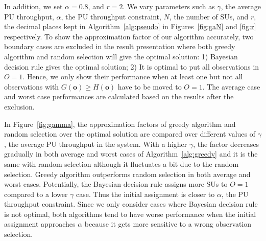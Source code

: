 \documentclass[conference]{IEEEtran}
\begin{document}
In addition, we set $\alpha=0.8$,  and $r=2$. We vary parameters such as $\gamma$, the average PU throughput, $\alpha$, the PU throughput constraint, $N$, the number of SUs, and $r$, the decimal places kept in Algorithm~\ref{alg:pseudo} in Figures~\ref{fig:gaN} and \ref{fig:r} respectively. To show the approximation factor of our algorithm accurately, two boundary cases are excluded in the result presentation where both greedy algorithm and random selection will give the optimal solution: 1) Bayesian decision rule gives the optimal solution; 2) It is optimal to put all observations in $O=1$. Hence, we only show their performance when at least one but not all observations with $G(\boldsymbol{o})\ge H(\boldsymbol{o})$ have to be moved to $O=1$. The average case and worst case performances are calculated based on the results after the exclusion.
 
In Figure~\ref{fig:gamma}, the approximation factors of greedy algorithm and random selection over the optimal solution are compared over different values of $\gamma$, the average PU throughput in the system. With a higher $\gamma$, the factor decreases gradually in both average and worst cases of Algorithm~\ref{alg:greedy} and it is the same with random selection although it fluctuates a bit due to the random selection. Greedy algorithm outperforms random selection in both average and worst cases. Potentially, the Bayesian decision rule assigns more SUs to $O=1$ compared to a lower $\gamma$ case. Thus the initial assignment is closer to $\alpha$, the PU throughput constraint. Since we only consider cases where Bayesian decision rule is not optimal, both algorithms tend to have worse performance when the initial assignment approaches $\alpha$ because it gets more sensitive to a wrong observation selection. 

\begin{figure*}[!t]
\centering
{}
\hfil
{}
\hfil
{}
\vspace{-1em}
\caption{Performance comparison of greedy algorithm and random selection.}
\vspace{-1.5em}
\label{fig:gaN}
\end{figure*}
\end{document}
